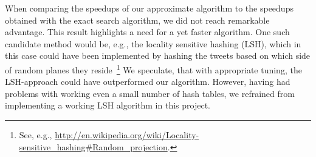 \documentclass{article}
\begin{document}
When comparing the speedups of our approximate algorithm to the speedups obtained with the exact search algorithm, we did not reach remarkable advantage.
This result highlights a need for a yet faster algorithm.
One such candidate method would be, e.g., the locality sensitive hashing (LSH),
which in this case could have been implemented by hashing the tweets based on which side of random planes they reside~\footnote{See, e.g., \url{http://en.wikipedia.org/wiki/Locality-sensitive_hashing\#Random_projection}.}
We speculate, that with appropriate tuning, the LSH-approach could have outperformed our algorithm.
However, having had problems with working even a small number of hash tables, we refrained from implementing a working LSH algorithm in this project.
\end{document}
